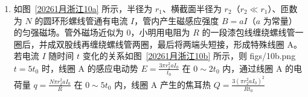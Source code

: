 \documentclass[\gkver]{gaokaozhenti}
\begin{document}
\begin{enumerate}
{该质点振动的总时间 $\Delta t' = \left(3 - \frac{5}{12}\right)\times10^{-3}\Us = \frac{31}{12}\times10^{-3}\Us = \frac{31}{12}T$

即 2 个全振动和剩余时间 $\frac{7}{12}T$，质点从平衡位置（$y=0$）开始向 $y$ 轴正方向振动，则该质点经过的路程为 $s = 2.5\times4A + A\left|\sin\left(2\pi\times\frac{7}{12}\right)\right| = 21\Umm$，C 正确；

D．机械波在介质中的传播速度由介质本身的性质（如密度、弹性模量）决定，与振源的周期、频率无关，故波速不变，D 错误。

故选 C。
}

\item
如图~\ref{20261月浙江10a} 所示，半径为 $r_{1}$、横截面半径为 $r_{2}$（$r_{2}\ll r_{1}$）、匝数为 $N$ 的圆环形螺线管通有电流 $I$，管内产生磁感应强度 $B = aI$（$a$ 为常量）的匀强磁场。管外磁场近似为 0，小明用电阻为 $R$ 的一段漆包线缠绕螺线管一圈后，并成双股线再缠绕螺线管两圈，最后将两端头短接，形成特殊线圈 A。若电流 $I$ 随时间 $t$ 变化的关系如图~\ref{20261月浙江10b} 所示，则 
{figs/10b.png}
{$t = 5t_{0}$ 时，线圈 A 的感应电动势 $E = \frac{3\pi r_{2}^{2}aI_{0}}{t_{0}}$}
{在 $0\sim2t_{0}$ 内，通过线圈 A 的电荷量 $q = \frac{N\pi r_{2}^{2}aI_{0}}{R}$}
{在 $0\sim5t_{0}$ 内，线圈 A 产生的焦耳热 $Q = \frac{3(\pi r_{2}^{2}aI_{0})^{2}}{Rt_{0}}$}

\end{enumerate}
\end{document}
